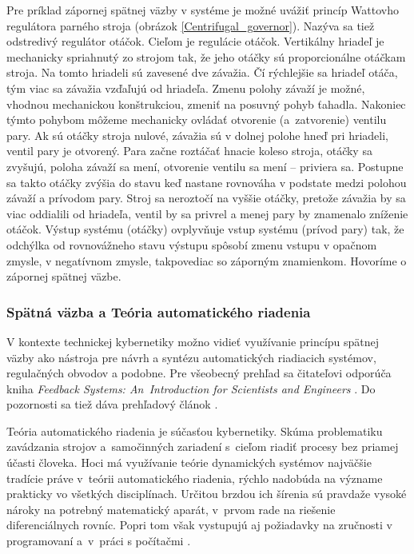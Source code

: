 \documentclass[a4paper, 10pt, ]{article}
\begin{document}
Pre príklad zápornej spätnej väzby v systéme je možné uvážiť princíp Wattovho regulátora parného stroja (obrázok \ref{Centrifugal_governor}). Nazýva sa tiež odstredivý regulátor otáčok. Cieľom je regulácie otáčok. Vertikálny hriadeľ je mechanicky spriahnutý zo strojom tak, že jeho otáčky sú proporcionálne otáčkam stroja. Na tomto hriadeli sú zavesené dve závažia. Čí rýchlejšie sa hriadeľ otáča, tým viac sa závažia vzďaľujú od hriadeľa. Zmenu polohy závaží je možné, vhodnou mechanickou konštrukciou, zmeniť na posuvný pohyb ťahadla. Nakoniec týmto pohybom môžeme mechanicky ovládať otvorenie (a~zatvorenie) ventilu pary. Ak sú otáčky stroja nulové, závažia sú v dolnej polohe hneď pri hriadeli, ventil pary je otvorený. Para začne roztáčať hnacie koleso stroja, otáčky sa zvyšujú, poloha závaží sa mení, otvorenie ventilu sa mení -- priviera sa. Postupne sa takto otáčky zvýšia do stavu keď nastane rovnováha v podstate medzi polohou závaží a prívodom pary. Stroj sa neroztočí na vyššie otáčky, pretože závažia by sa viac oddialili od hriadeľa, ventil by sa privrel a menej pary by znamenalo zníženie otáčok. Výstup systému (otáčky) ovplyvňuje vstup systému (prívod pary) tak, že odchýlka od rovnovážneho stavu výstupu spôsobí zmenu vstupu v opačnom zmysle, v negatívnom zmysle, takpovediac so záporným znamienkom. Hovoríme o zápornej spätnej väzbe. 




\subsubsection{Spätná väzba a Teória automatického riadenia}

V kontexte technickej kybernetiky možno vidieť využívanie princípu spätnej väzby ako nástroja pre návrh a syntézu automatických riadiacich systémov, regulačných obvodov a podobne. Pre všeobecný prehľad sa čitateľovi odporúča kniha \emph{Feedback Systems: An~Introduction for Scientists and Engineers} \cite{Aastroem2020}. Do pozornosti sa tiež dáva prehľadový článok \cite{Aastroem2014}.



Teória automatického riadenia je súčasťou kybernetiky. Skúma problematiku zavádzania strojov a~samočinných zariadení s~cieľom riadiť procesy bez priamej účasti človeka. Hoci má využívanie teórie dynamických systémov najväčšie tradície práve v~teórii automatického riadenia, rýchlo nadobúda na význame prakticky vo všetkých disciplínach. Určitou brzdou ich šírenia sú pravdaže vysoké nároky na potrebný matematický aparát, v~prvom rade na riešenie diferenciálnych rovníc. Popri tom však vystupujú aj požiadavky na zručnosti v programovaní a~v~práci s počítačmi \cite{Huba2002}.
\end{document}

